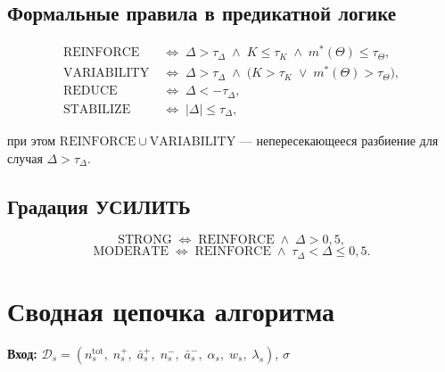 \documentclass[12pt,a4paper]{article}
\begin{document}
\subsection{Формальные правила в предикатной логике}

\begin{align}
  \mathrm{REINFORCE}
    &\;\Longleftrightarrow\;
      \Delta > \tau_\Delta
      \;\wedge\; K \le \tau_K
      \;\wedge\; m^*(\Theta) \le \tau_\Theta,
    \label{eq:reinforce} \\[6pt]
  \mathrm{VARIABILITY}
    &\;\Longleftrightarrow\;
      \Delta > \tau_\Delta
      \;\wedge\; \bigl(K > \tau_K
                       \;\vee\; m^*(\Theta) > \tau_\Theta\bigr),
    \label{eq:variability} \\[6pt]
  \mathrm{REDUCE}
    &\;\Longleftrightarrow\;
      \Delta < -\tau_\Delta,
    \label{eq:reduce} \\[6pt]
  \mathrm{STABILIZE}
    &\;\Longleftrightarrow\;
      |\Delta| \le \tau_\Delta,
    \label{eq:stabilize}
\end{align}

\noindent
при этом $\mathrm{REINFORCE} \cup \mathrm{VARIABILITY}$ --- непересекающееся разбиение
для случая $\Delta > \tau_\Delta$.

\subsection{Градация УСИЛИТЬ}

\[
  \mathrm{STRONG} \;\Longleftrightarrow\; \mathrm{REINFORCE} \;\wedge\; \Delta > 0{,}5,
\]
\[
  \mathrm{MODERATE} \;\Longleftrightarrow\; \mathrm{REINFORCE} \;\wedge\;
    \tau_\Delta < \Delta \le 0{,}5.
\]

\section{Сводная цепочка алгоритма}

\noindent\textbf{Вход:} $\mathcal{D}_s = (n_s^{\mathrm{tot}},\; n_s^{+},\; \bar{a}_s^{+},\; n_s^{-},\; \bar{a}_s^{-},\; \alpha_s,\; w_s,\; \lambda_s)$, $\sigma$
\end{document}

